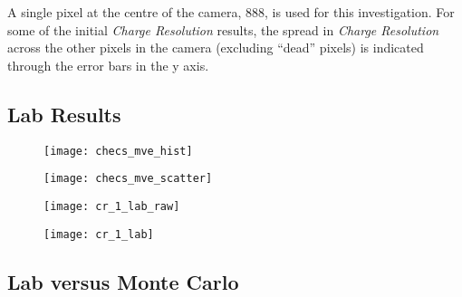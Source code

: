 A single pixel at the centre of the camera, 888, is used for this investigation. For some of the initial \textit{Charge Resolution} results, the spread in \textit{Charge Resolution} across the other pixels in the camera (excluding ``dead'' pixels) is indicated through the error bars in the y axis.

\subsection{Lab Results}

\begin{figure}
	\centering
    \texttt{[image: checs\_mve\_hist]} 
	\caption[]{}
	\label{fig:checs_mve_hist}
\end{figure}

\begin{figure}
	\centering
    \texttt{[image: checs\_mve\_scatter]} 
	\caption[]{}
	\label{fig:checs_mve_scatter}
\end{figure}

\begin{figure}
	\centering
    \texttt{[image: cr\_1\_lab\_raw]} 
	\caption[]{}
	\label{fig:cr_1_lab_raw}
\end{figure}

\begin{figure}
	\centering
    \texttt{[image: cr\_1\_lab]} 
	\caption[]{}
	\label{fig:cr_1_lab}
\end{figure}


\subsection{Lab versus Monte Carlo}

